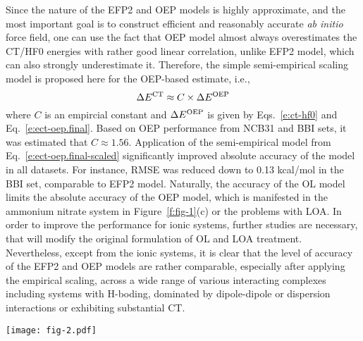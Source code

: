 \documentclass[aip,jcp,amsmath,amssymb,reprint,floatfix]{revtex4-1}
\begin{document}
Since the nature of the EFP2 and OEP models is highly approximate,
and the most important goal is to construct efficient and reasonably
accurate \emph{ab initio} force field, one can use the fact that
OEP model almost always overestimates the CT/HF0 energies
with rather good linear correlation,
unlike EFP2 model, which can also strongly underestimate it.
Therefore, the simple semi\hyp{}empirical scaling model is proposed here
for the OEP\hyp{}based estimate, i.e.,
%
\begin{equation} \label{e:ect-oep.final-scaled}
 \Delta E^{\rm CT} \approx C \times \Delta E^{\rm OEP}
\end{equation}
%
where $C$ is an empircial constant and $\Delta E^{\rm OEP}$ is given by
Eqs.~\eqref{e:ct-hf0} and Eq.~\eqref{e:ect-oep.final}. Based on
OEP performance from NCB31 and BBI sets, it was estimated
that $C\approx 1.56$. Application of the semi\hyp{}empirical model
from Eq.~\eqref{e:ect-oep.final-scaled} significantly improved
absolute accuracy of the model in all datasets. 
For instance, RMSE was reduced down to 0.13 kcal/mol in the BBI set,
comparable to EFP2 model.
Naturally, the accuracy of the OL model limits the absolute accuracy
of the OEP model, which is manifested in the ammonium nitrate system
in Figure~\ref{f:fig-1}(c) or the problems with LOA. 
In order to improve the performance for ionic systems,
further studies are necessary, that will modify the original formulation
of OL and LOA treatment. Nevertheless, except from the ionic systems,
it is clear that the level of accuracy of the EFP2 and OEP models are rather comparable,
especially after applying the empirical scaling,
across a wide range of various interacting complexes including 
systems with H-boding, dominated by dipole-dipole or dispersion interactions or 
exhibiting substantial CT.





%
\begin{figure*}[h]
\texttt{[image: fig-2.pdf]}
\caption{\label{f:fig-2} {\bf Accuracy of the ERI elimination technique.}
(a) NCB31 
database,\cite{Zhao.Schultz.Truhlar.JCTC.2006,
Zhao.Truhlar.JCTC.2005,Zhao.Schultz.Truhlar.JCTC.2006,Zhao.Schultz.Truhlar.JCP.2005} 
and
(b) BBI subset\cite{Burns.Faver.Zheng.Marshall.Smith.Vanommeslaeghe.MacKerell.Merz.Sherrill.JCP.2017} 
from the BioFragment Database.
The EDF-1 scheme with the aug-cc-pVDZ-jkfit auxiliary basis set
for the OEP calculations.
} 
\end{figure*}
%
\end{document}
